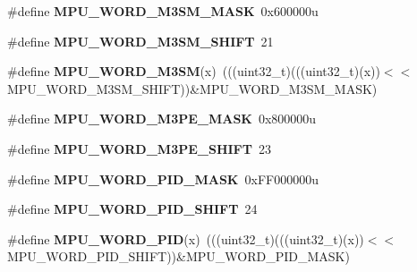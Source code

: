 \begin{DoxyCompactItemize}
\item 
\#define {\bfseries M\+P\+U\+\_\+\+W\+O\+R\+D\+\_\+\+M3\+S\+M\+\_\+\+M\+A\+SK}~0x600000u\hypertarget{group__MPU__Register__Masks_ga66fa2f8378ee3158e24b8733413da43d}{}\label{group__MPU__Register__Masks_ga66fa2f8378ee3158e24b8733413da43d}

\item 
\#define {\bfseries M\+P\+U\+\_\+\+W\+O\+R\+D\+\_\+\+M3\+S\+M\+\_\+\+S\+H\+I\+FT}~21\hypertarget{group__MPU__Register__Masks_ga41a8f42d1e7fab735444f5576ccbf61e}{}\label{group__MPU__Register__Masks_ga41a8f42d1e7fab735444f5576ccbf61e}

\item 
\#define {\bfseries M\+P\+U\+\_\+\+W\+O\+R\+D\+\_\+\+M3\+SM}(x)~(((uint32\+\_\+t)(((uint32\+\_\+t)(x))$<$$<$M\+P\+U\+\_\+\+W\+O\+R\+D\+\_\+\+M3\+S\+M\+\_\+\+S\+H\+I\+FT))\&M\+P\+U\+\_\+\+W\+O\+R\+D\+\_\+\+M3\+S\+M\+\_\+\+M\+A\+SK)\hypertarget{group__MPU__Register__Masks_gaad500dfae0f17171e1038d6b91be66c9}{}\label{group__MPU__Register__Masks_gaad500dfae0f17171e1038d6b91be66c9}

\item 
\#define {\bfseries M\+P\+U\+\_\+\+W\+O\+R\+D\+\_\+\+M3\+P\+E\+\_\+\+M\+A\+SK}~0x800000u\hypertarget{group__MPU__Register__Masks_ga26d07a2d39b4b4873bc68d44585f6cc7}{}\label{group__MPU__Register__Masks_ga26d07a2d39b4b4873bc68d44585f6cc7}

\item 
\#define {\bfseries M\+P\+U\+\_\+\+W\+O\+R\+D\+\_\+\+M3\+P\+E\+\_\+\+S\+H\+I\+FT}~23\hypertarget{group__MPU__Register__Masks_gafccf88108c41e0b025463d1de832fe6a}{}\label{group__MPU__Register__Masks_gafccf88108c41e0b025463d1de832fe6a}

\item 
\#define {\bfseries M\+P\+U\+\_\+\+W\+O\+R\+D\+\_\+\+P\+I\+D\+\_\+\+M\+A\+SK}~0x\+F\+F000000u\hypertarget{group__MPU__Register__Masks_gae873b29b111c50ef587d2702b91233aa}{}\label{group__MPU__Register__Masks_gae873b29b111c50ef587d2702b91233aa}

\item 
\#define {\bfseries M\+P\+U\+\_\+\+W\+O\+R\+D\+\_\+\+P\+I\+D\+\_\+\+S\+H\+I\+FT}~24\hypertarget{group__MPU__Register__Masks_ga939df7cf3062667856c6f7f0324fcc2e}{}\label{group__MPU__Register__Masks_ga939df7cf3062667856c6f7f0324fcc2e}

\item 
\#define {\bfseries M\+P\+U\+\_\+\+W\+O\+R\+D\+\_\+\+P\+ID}(x)~(((uint32\+\_\+t)(((uint32\+\_\+t)(x))$<$$<$M\+P\+U\+\_\+\+W\+O\+R\+D\+\_\+\+P\+I\+D\+\_\+\+S\+H\+I\+FT))\&M\+P\+U\+\_\+\+W\+O\+R\+D\+\_\+\+P\+I\+D\+\_\+\+M\+A\+SK)\hypertarget{group__MPU__Register__Masks_gabcbfe603754463bb872a3d8e306b8548}{}\label{group__MPU__Register__Masks_gabcbfe603754463bb872a3d8e306b8548}


\end{DoxyCompactItemize}
